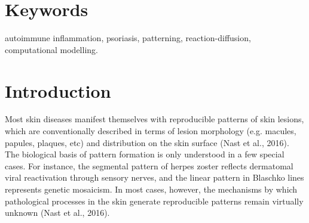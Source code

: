 \section{Keywords}
autoimmune inflammation, psoriasis, patterning, reaction-diffusion, computational modelling.

\section{Introduction} 
Most skin diseases manifest themselves with reproducible patterns of skin lesions, which are conventionally described in terms of lesion morphology (e.g. macules, papules, plaques, etc) and distribution on the skin surface (Nast et al., 2016). The biological basis of pattern formation is only understood in a few special cases. For instance, the segmental pattern of herpes zoster reflects dermatomal viral reactivation through sensory nerves, and the linear pattern in Blaschko lines represents genetic mosaicism. In most cases, however, the mechanisms by which pathological processes in the skin generate reproducible patterns remain virtually unknown (Nast et al., 2016).
